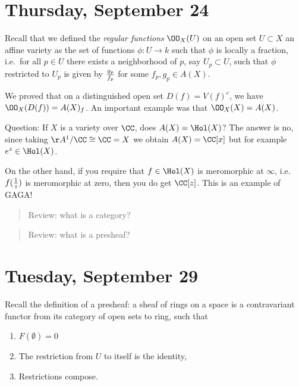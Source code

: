 \hypertarget{thursday-september-24}{%
\section{Thursday, September 24}\label{thursday-september-24}}

Recall that we defined the \emph{regular functions} \(\OO_X(U)\) on an
open set \(U\subset X\) an affine variety as the set of functions
\(\phi: U\to k\) such that \(\phi\) is locally a fraction, i.e.~for all
\(p\in U\) there exists a neighborhood of \(p\), say \(U_p \subset U\),
such that \(\phi\) restricted to \(U_p\) is given by \(g_p \over f_p\)
for some \(f_p, g_p \in A(X)\).

We proved that on a distinguished open set \(D(f) = V(f)^c\), we have
\(\OO_X(D(f)) = A(X)_f\). An important example was that
\(\OO_X(X) = A(X)\).

Question: If \(X\) is a variety over \(\CC\), does \(A(X) = \Hol(X)\)?
The answer is no, since taking \(\AA^1/\CC \cong \CC = X\) we obtain
\(A(X) = \CC[x]\) but for example \(e^z \in \Hol(X)\).

On the other hand, if you require that \(f\in \Hol(X)\) is meromorphic
at \(\infty\), i.e.~\(f({1\over z})\) is meromorphic at zero, then you
do get \(\CC[z]\). This is an example of GAGA!

\begin{quote}
Review: what is a category?
\end{quote}

\begin{quote}
Review: what is a presheaf?
\end{quote}

\hypertarget{tuesday-september-29}{%
\section{Tuesday, September 29}\label{tuesday-september-29}}

Recall the definition of a presheaf: a sheaf of rings on a space is a
contravariant functor from its category of open sets to ring, such that

\begin{enumerate}
\def\labelenumi{\arabic{enumi}.}
\tightlist
\item
  \(F(\emptyset) = 0\)
\item
  The restriction from \(U\) to itself is the identity,
\item
  Restrictions compose.
\end{enumerate}


